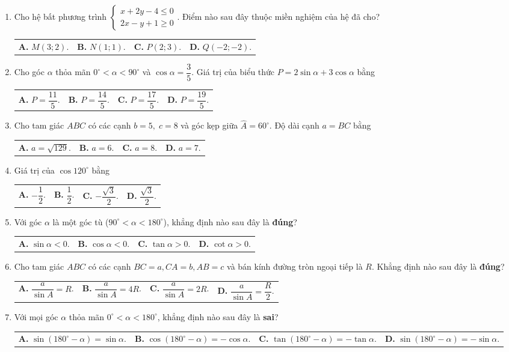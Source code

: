 \documentclass[12pt,a4paper]{article}
\makeatletter
\newcommand{\four}[4]{\par\noindent\begin{tabularx}{\linewidth}{@{}*{4}{>{\raggedright\arraybackslash}X}@{}}\textbf{A.} #1&\textbf{B.} #2&\textbf{C.} #3&\textbf{D.} #4\end{tabularx}}
\makeatother
\begin{document}
\begin{enumerate}
\item Cho hệ bất phương trình $\begin{cases} x + 2y - 4 \le 0 \\ 2x - y + 1 \ge 0 \end{cases}$. Điểm nào sau đây thuộc miền nghiệm của hệ đã cho?
\four{$M(3; 2)$.}{$N(1; 1)$.}{$P(2; 3)$.}{$Q(-2; -2)$.}

\item Cho góc $\alpha$ thỏa mãn $0^\circ < \alpha < 90^\circ$ và $\cos \alpha = \dfrac{3}{5}$. Giá trị của biểu thức $P = 2\sin \alpha + 3\cos \alpha$ bằng
\four{$P = \dfrac{11}{5}$.}{$P = \dfrac{14}{5}$.}{$P = \dfrac{17}{5}$.}{$P = \dfrac{19}{5}$.}

\item Cho tam giác $ABC$ có các cạnh $b = 5,\; c = 8$ và góc kẹp giữa $\widehat{A} = 60^\circ$. Độ dài cạnh $a = BC$ bằng
\four{$a = \sqrt{129}$.}{$a = 6$.}{$a = 8$.}{$a = 7$.}

\item Giá trị của $\cos 120^\circ$ bằng
\four{$-\dfrac{1}{2}$.}{$\dfrac{1}{2}$.}{$-\dfrac{\sqrt{3}}{2}$.}{$\dfrac{\sqrt{3}}{2}$.}

\item Với góc $\alpha$ là một góc tù ($90^\circ < \alpha < 180^\circ$), khẳng định nào sau đây là \textbf{đúng}?
\four{$\sin \alpha < 0$.}{$\cos \alpha < 0$.}{$\tan \alpha > 0$.}{$\cot \alpha > 0$.}

\item Cho tam giác $ABC$ có các cạnh $BC = a, CA = b, AB = c$ và bán kính đường tròn ngoại tiếp là $R$. Khẳng định nào sau đây là \textbf{đúng}?
\four{$\dfrac{a}{\sin A} = R$.}{$\dfrac{a}{\sin A} = 4R$.}{$\dfrac{a}{\sin A} = 2R$.}{$\dfrac{a}{\sin A} = \dfrac{R}{2}$.}

\item Với mọi góc $\alpha$ thỏa mãn $0^\circ < \alpha < 180^\circ$, khẳng định nào sau đây là \textbf{sai}?
\four{$\sin(180^\circ - \alpha) = \sin \alpha$.}{$\cos(180^\circ - \alpha) = -\cos \alpha$.}{$\tan(180^\circ - \alpha) = -\tan \alpha$.}{$\sin(180^\circ - \alpha) = -\sin \alpha$.}
\end{enumerate}
\end{document}

